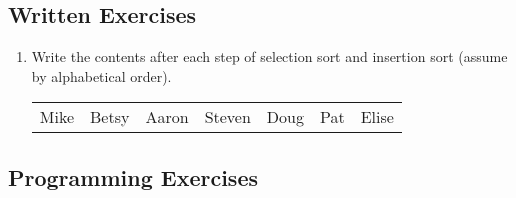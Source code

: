 
\subsection{Written Exercises}

\setcounter{counter}{1}
\begin{enumerate}[label={\arabic{counter}\addtocounter{counter}{1}}.]

\item Write the contents after each step of selection sort and insertion sort (assume by alphabetical order).
\begin{table}[h]
\begin{tabular}{lllllll}
Mike & Betsy & Aaron & Steven & Doug & Pat & Elise
\end{tabular}
\end{table}

\end{enumerate}

\subsection{Programming Exercises}